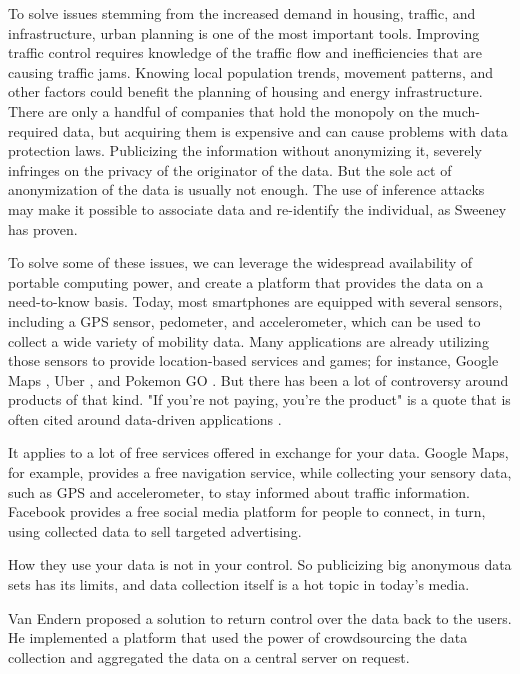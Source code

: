 To solve issues stemming from the increased demand in housing, traffic, and infrastructure, urban planning is one of the most important tools. Improving traffic control requires knowledge of the traffic flow and inefficiencies that are causing traffic jams. Knowing local population trends, movement patterns, and other factors could benefit the planning of housing and energy infrastructure. There are only a handful of companies that hold the monopoly on the much-required data, but acquiring them is expensive and can cause problems with data protection laws. Publicizing the information without anonymizing it, severely infringes on the privacy of the originator of the data. But the sole act of anonymization of the data is usually not enough. The use of inference attacks may make it possible to associate data and re-identify the individual, as Sweeney \cite{DBLP:journals/ijufks/Sweene02} has proven.

To solve some of these issues, we can leverage the widespread availability of portable computing power, and create a platform that provides the data on a need-to-know basis. Today, most smartphones are equipped with several sensors, including a GPS sensor, pedometer, and accelerometer, which can be used to collect a wide variety of mobility data. Many applications are already utilizing those sensors to provide location-based services and games; for instance, Google Maps \cite{maps}, Uber \cite{uber}, and Pokemon GO \cite{pokemon}. But there has been a lot of controversy around products of that kind. "If you're not paying, you're the product" is a quote that is often cited around data-driven applications \cite{newyorktimes}\cite{tedtalk}\cite{arstechnica}.

It applies to a lot of free services offered in exchange for your data. Google Maps, for example, provides a free navigation service, while collecting your sensory data, such as GPS and accelerometer, to stay informed about traffic information. Facebook provides a free social media platform for people to connect, in turn, using collected data to sell targeted advertising.

How they use your data is not in your control. So publicizing big anonymous data sets has its limits, and data collection itself is a hot topic in today's media. 

Van Endern proposed a solution to return control over the data back to the users. He implemented a platform that used the power of crowdsourcing the data collection and aggregated the data on a central server on request.

